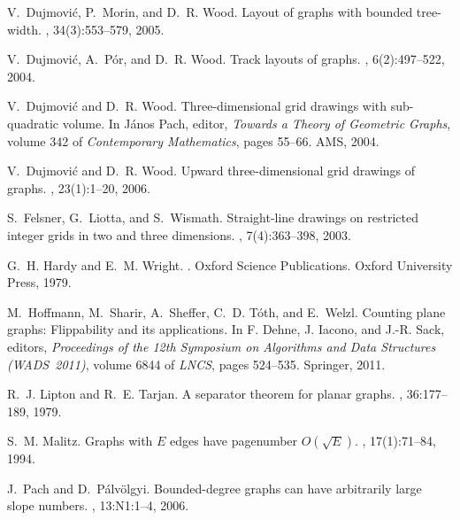 \documentclass[12pt]{article}
\begin{document}
\begin{thebibliography}{10}
V.~Dujmovi{\'c}, P.~Morin, and D.~R. Wood.
\newblock Layout of graphs with bounded tree-width.
, 34(3):553--579, 2005.

V.~Dujmovi{\'c}, A.~P\'or, and D.~R. Wood.
\newblock Track layouts of graphs.
,
  6(2):497--522, 2004.

V.~Dujmovi{\'c} and D.~R. Wood.
\newblock Three-dimensional grid drawings with sub-quadratic volume.
\newblock In J\'{a}nos Pach, editor, {\em Towards a Theory of Geometric
  Graphs}, volume 342 of {\em Contemporary Mathematics}, pages 55--66. AMS,
  2004.

V.~Dujmovi{\'c} and D.~R. Wood.
\newblock Upward three-dimensional grid drawings of graphs.
, 23(1):1--20, 2006.

S.~Felsner, G.~Liotta, and S.~Wismath.
\newblock Straight-line drawings on restricted integer grids in two and three
  dimensions.
, 7(4):363--398,
  2003.

G.~H. Hardy and E.~M. Wright.
.
\newblock Oxford Science Publications. Oxford University Press, 1979.

M.~Hoffmann, M.~Sharir, A.~Sheffer, C.~D. T{\'o}th, and E.~Welzl.
\newblock Counting plane graphs: Flippability and its applications.
\newblock In F. Dehne, J. Iacono, and J.-R. Sack, editors,
  {\em Proceedings of the 12th Symposium on Algorithms and Data Structures
  (WADS~2011)}, volume 6844 of {\em LNCS}, pages
  524--535. Springer, 2011.

R.~J. Lipton and R.~E. Tarjan.
\newblock A separator theorem for planar graphs.
, 36:177--189, 1979.

S.~M. Malitz.
\newblock Graphs with {$E$} edges have pagenumber {$O(\sqrt{E})$}.
, 17(1):71--84, 1994.

J.~Pach and D.~P\'alv\"olgyi.
\newblock Bounded-degree graphs can have arbitrarily large slope numbers.
, 13:N1:1--4, 2006.


\end{thebibliography}
\end{document}

